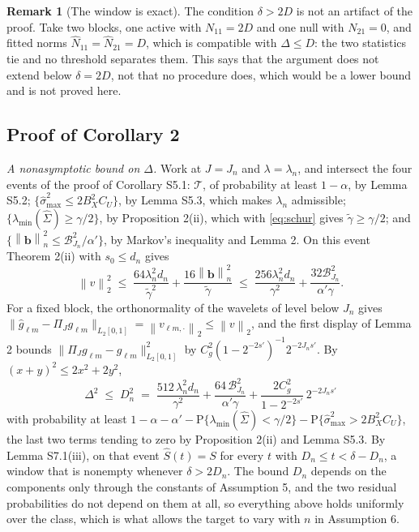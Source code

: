 \documentclass[10pt]{book}
\theoremstyle{definition}
\newtheorem{remark}{Remark}[section]
\newcommand{\Prob}{\mathrm{P}}
\newcommand{\norm}[1]{\left\lVert #1 \right\rVert}
\newcommand{\normn}[1]{\left\lVert #1 \right\rVert_{n}}
\newcommand{\cv}{\ell}
\newcommand{\md}{m}
\newcommand{\gcomp}[2]{g_{#1#2}}
\newcommand{\PiJ}{\Pi_{J}}
\newcommand{\Gramhat}{\widehat{\Sigma}}
\newcommand{\pen}{\lambda}
\newcommand{\penn}{\lambda_{n}}
\newcommand{\seff}{s'}
\newcommand{\bb}{\mathbf{b}}
\newcommand{\smax}{\widehat{\sigma}_{\max}}
\newcommand{\gtil}{\widetilde{\gamma}}
\newcommand{\lmin}{\lambda_{\min}}
\begin{document}
{\begin{remark}[The window is exact]
\label{rem:window}
The condition $\delta > 2D$ is not an artifact of the proof. Take two blocks,
one active with $N_{11} = 2D$ and one null with $N_{21} = 0$, and fitted
norms $\widehat{N}_{11} = \widehat{N}_{21} = D$, which is compatible with
$\Delta \le D$: the two statistics tie and no threshold separates them. This
says that the argument does not extend below $\delta = 2D$, not that no
procedure does, which would be a lower bound and is not proved here.
\end{remark}

\subsection*{Proof of Corollary 2}

\emph{A nonasymptotic bound on $\Delta$.} Work at $J = J_n$ and $\pen = \penn$,
and intersect the four events of the proof of Corollary S5.1: $\mathcal{T}$,
of probability at least $1-\alpha$, by Lemma S5.2;
$\{\smax^2 \le 2B_X^2C_U\}$, by Lemma S5.3, which makes $\penn$ admissible;
$\{\lmin(\Gramhat) \ge \gamma/2\}$, by Proposition 2(ii), which with
\eqref{eq:schur} gives $\gtil \ge \gamma/2$; and
$\{\normn{\bb}^2 \le \mathcal{B}^2_{J_n}/\alpha'\}$, by Markov's inequality and
Lemma 2. On this event Theorem 2(ii) with $s_0 \le d_n$ gives
\[
  \norm{v}_2^2 \;\le\; \frac{64\penn^2d_n}{\gtil^2}
  + \frac{16\normn{\bb}^2}{\gtil}
  \;\le\; \frac{256\penn^2d_n}{\gamma^2}
  + \frac{32\mathcal{B}^2_{J_n}}{\alpha'\gamma} .
\]
For a fixed block, the orthonormality of the wavelets of level below $J_n$
gives $\lVert\widehat{g}_{\cv\md} - \PiJ\gcomp{\cv}{\md}\rVert_{L_2[0,1]} =
\norm{v_{\cv\md,\cdot}}_2 \le \norm{v}_2$, and the first display of Lemma 2
bounds $\lVert\PiJ\gcomp{\cv}{\md} - \gcomp{\cv}{\md}\rVert^2_{L_2[0,1]}$ by
$C_g^2(1-2^{-2\seff})^{-1}2^{-2J_n\seff}$. By $(x+y)^2 \le 2x^2 + 2y^2$,
\begin{equation}
  \label{eq:Dn}
  \Delta^2 \;\le\; D_n^2 \;=\; \frac{512\,\penn^2d_n}{\gamma^2}
  + \frac{64\,\mathcal{B}^2_{J_n}}{\alpha'\gamma}
  + \frac{2C_g^2}{1-2^{-2\seff}}\,2^{-2J_n\seff}
\end{equation}
with probability at least
$1 - \alpha - \alpha' - \Prob\{\lmin(\Gramhat) < \gamma/2\} -
\Prob\{\smax^2 > 2B_X^2C_U\}$, the last two terms tending to zero by
Proposition 2(ii) and Lemma S5.3. By Lemma S7.1(iii), on that event
$\widehat{S}(t) = S$ for every $t$ with $D_n \le t < \delta - D_n$, a window
that is nonempty whenever $\delta > 2D_n$. The bound $D_n$ depends on the
components only through the constants of Assumption 5, and the two residual
probabilities do not depend on them at all, so everything above holds
uniformly over the class, which is what allows the target to vary with $n$ in
Assumption 6.

}
\end{document}
